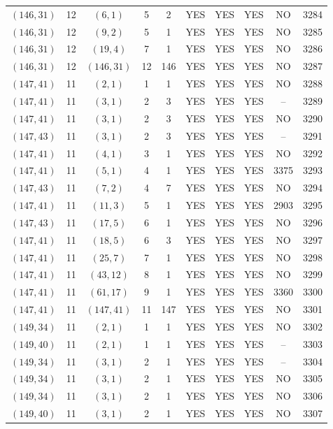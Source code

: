 \begin{longtable}{|c|c|c|c|c|c|c|c|c|c|}
$(146, 31)$ & 12 & $(6, 1)$ & 5 & 2 & YES & YES & YES & NO & 3284\\
$(146, 31)$ & 12 & $(9, 2)$ & 5 & 1 & YES & YES & YES & NO & 3285\\
$(146, 31)$ & 12 & $(19, 4)$ & 7 & 1 & YES & YES & YES & NO & 3286\\
$(146, 31)$ & 12 & $(146, 31)$ & 12 & 146 & YES & YES & YES & NO & 3287\\
$(147, 41)$ & 11 & $(2, 1)$ & 1 & 1 & YES & YES & YES & NO & 3288\\
$(147, 41)$ & 11 & $(3, 1)$ & 2 & 3 & YES & YES & YES & -- & 3289\\
$(147, 41)$ & 11 & $(3, 1)$ & 2 & 3 & YES & YES & YES & NO & 3290\\
$(147, 43)$ & 11 & $(3, 1)$ & 2 & 3 & YES & YES & YES & -- & 3291\\
$(147, 41)$ & 11 & $(4, 1)$ & 3 & 1 & YES & YES & YES & NO & 3292\\
$(147, 41)$ & 11 & $(5, 1)$ & 4 & 1 & YES & YES & YES & 3375 & 3293\\
$(147, 43)$ & 11 & $(7, 2)$ & 4 & 7 & YES & YES & YES & NO & 3294\\
$(147, 41)$ & 11 & $(11, 3)$ & 5 & 1 & YES & YES & YES & 2903 & 3295\\
$(147, 43)$ & 11 & $(17, 5)$ & 6 & 1 & YES & YES & YES & NO & 3296\\
$(147, 41)$ & 11 & $(18, 5)$ & 6 & 3 & YES & YES & YES & NO & 3297\\
$(147, 41)$ & 11 & $(25, 7)$ & 7 & 1 & YES & YES & YES & NO & 3298\\
$(147, 41)$ & 11 & $(43, 12)$ & 8 & 1 & YES & YES & YES & NO & 3299\\
$(147, 41)$ & 11 & $(61, 17)$ & 9 & 1 & YES & YES & YES & 3360 & 3300\\
$(147, 41)$ & 11 & $(147, 41)$ & 11 & 147 & YES & YES & YES & NO & 3301\\
$(149, 34)$ & 11 & $(2, 1)$ & 1 & 1 & YES & YES & YES & NO & 3302\\
$(149, 40)$ & 11 & $(2, 1)$ & 1 & 1 & YES & YES & YES & -- & 3303\\
$(149, 34)$ & 11 & $(3, 1)$ & 2 & 1 & YES & YES & YES & -- & 3304\\
$(149, 34)$ & 11 & $(3, 1)$ & 2 & 1 & YES & YES & YES & NO & 3305\\
$(149, 34)$ & 11 & $(3, 1)$ & 2 & 1 & YES & YES & YES & NO & 3306\\
$(149, 40)$ & 11 & $(3, 1)$ & 2 & 1 & YES & YES & YES & NO & 3307\\

\end{longtable}
